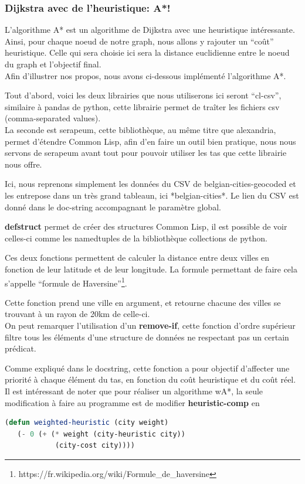 \documentclass[a4paper, 12pt]{article}
\newcommand{\pather}[1]{
  
}
\numberwithin{equation}{subsection}
\begin{document}
\subsubsection{Dijkstra avec de l'heuristique: A*!}
L'algorithme A* est un algorithme de Dijkstra avec une heuristique intéressante. \\
Ainsi, pour chaque noeud de notre graph, nous allons y rajouter un ``coût'' heuristique. Celle qui sera choisie ici sera la distance euclidienne entre le noeud du graph et l'objectif final. \\
Afin d'illustrer nos propos, nous avons ci-dessous implémenté l'algorithme A*.
\pather{1-2}
Tout d'abord, voici les deux librairies que nous utiliserons ici seront ``cl-csv'', similaire à pandas de python, cette librairie permet de traîter les fichiers csv (comma-separated values). \\
La seconde est serapeum, cette bibliothèque, au même titre que alexandria, permet d'étendre Common Lisp, afin d'en faire un outil bien pratique, nous nous servons de serapeum avant tout pour pouvoir utiliser les tas que cette librairie nous offre.
\pather{7-25}
Ici, nous reprenons simplement les données du CSV de belgian-cities-geocoded et les entrepose dans un très grand tableaun, ici *belgian-cities*. Le lien du CSV est donné dans le doc-string accompagnant le paramètre global.
\pather{4-5}
{\bf defstruct} permet de créer des structures Common Lisp, il est possible de voir celles-ci comme les namedtuples de la bibliothèque collections de python.
\pather{28-53}
Ces deux fonctions permettent de calculer la distance entre deux villes en fonction de leur latitude et de leur longitude. La formule permettant de faire cela s'appelle ``formule de Haversine''\footnote{https://fr.wikipedia.org/wiki/Formule\_de\_haversine}.
\pather{55-62}
Cette fonction prend une ville en argument, et retourne chacune des villes se trouvant à un rayon de 20km de celle-ci. \\
On peut remarquer l'utilisation d'un {\bf remove-if}, cette fonction d'ordre supérieur filtre tous les éléments d'une structure de données ne respectant pas un certain prédicat.
\pather{64-69}
Comme expliqué dans le docstring, cette fonction a pour objectif d'affecter une priorité à chaque élément du tas, en fonction du coût heuristique et du coût réel. \\
Il est intéressant de noter que pour réaliser un algorithme wA*, la seule modification à faire au programme est de modifier {\bf heuristic-comp} en
\begin{lstlisting}[language=Lisp]
(defun weighted-heuristic (city weight)
   (- 0 (+ (* weight (city-heuristic city))
            (city-cost city))))
\end{lstlisting}
\end{document}
